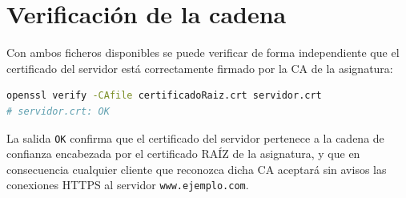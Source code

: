 \section{Verificación de la cadena}
Con ambos ficheros disponibles se puede verificar de forma independiente que el certificado del servidor está correctamente firmado por la CA de la asignatura:
\begin{lstlisting}[language=bash]
openssl verify -CAfile certificadoRaiz.crt servidor.crt
# servidor.crt: OK
\end{lstlisting}
La salida \texttt{OK} confirma que el certificado del servidor pertenece a la cadena de confianza encabezada por el certificado RAÍZ de la asignatura, y que en consecuencia cualquier cliente que reconozca dicha CA aceptará sin avisos las conexiones HTTPS al servidor \texttt{www.ejemplo.com}.
